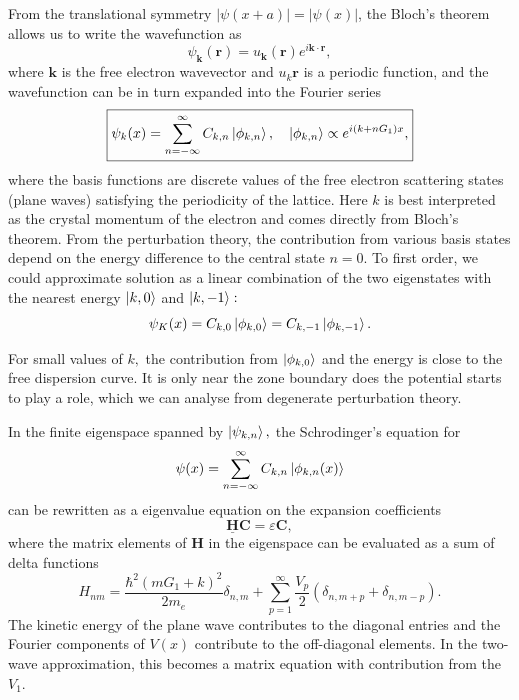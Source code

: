 \documentclass{article}
\theoremstyle{nonumberplain}
\begin{document}
From the translational symmetry \(\left\vert \psi(x+a) \right\vert = \left\vert \psi(x) \right\vert \), the Bloch's theorem allows us to write the wavefunction as 
\[
    \psi_{\mathbf{k}} (\mathbf{r}) = u_{\mathbf{k}}(\mathbf{r}) e^{i \mathbf{k} \cdot \mathbf{r}}, 
\] 
where $\mathbf{k}$ is the free electron wavevector and $u_k{\mathbf{r}}$ is a periodic function, and the wavefunction can be in turn expanded into the Fourier series
\[
    \boxed{
        \psi_k(x) = \sum_{n=-\infty }^{\infty} C_{k,n} \ket{\phi_{k,n}}, \quad 
        \ket{\phi_{k,n}} \propto e^{i (k + n G_1) x}, 
    }
\]
where the basis functions are discrete values of the free electron scattering states (plane waves) satisfying the periodicity of the lattice. Here $k$ is best interpreted as the crystal momentum of the electron and comes directly from Bloch's theorem. From the perturbation theory, the contribution from various basis states depend on the energy difference to the central state $n=0.$ To first order, we could approximate solution as a linear combination of the two eigenstates with the nearest energy $\ket{k,0}$ and $\ket{k,-1}:$
\[
    \psi_K(x) = C_{k,0} \ket{\phi_{k,0}} = C_{k,-1} \ket{\phi_{k,-1}}. 
\]

For small values of $k,$ the contribution from $\ket{\phi_{k,0}}$ and the energy is close to the free dispersion curve. It is only near the zone boundary does the potential starts to play a role, which we can analyse from degenerate perturbation theory. 

In the finite eigenspace spanned by $\ket{\psi_{k,n}},$ the Schrodinger's equation for 
\[
    \psi(x) = \sum_{n=-\infty }^{\infty } C_{k,n} \ket{\phi_{k,n}(x)}
\]
can be rewritten as a eigenvalue equation on the expansion coefficients
\[
    \mathbf{\underline{H}} \mathbf{C} = \varepsilon \mathbf{C},  
\]
where the matrix elements of $\mathbf{H}$ in the eigenspace can be evaluated as a sum of delta functions
\[
    H_{nm} = \frac{\hbar^{2} (m G_1 + k)^{2} }{2m_e}\delta_{n,m} + \sum_{p=1}^{\infty} \frac{V_p}{2}(\delta_{n,m+p} + \delta_{n,m-p}). 
\]
The kinetic energy of the plane wave contributes to the diagonal entries and the Fourier components of $V(x)$ contribute to the off-diagonal elements. In the two-wave approximation, this becomes a matrix equation with contribution from the $V_1.$ 
\end{document}
